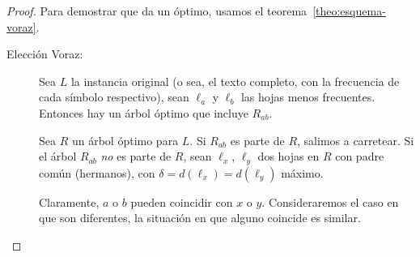   \begin{proof}
    Para demostrar que da un óptimo,
    usamos el teorema~\ref{theo:esquema-voraz}.
    \begin{description}
    \item[Elección Voraz:]
      Sea \(L\) la instancia original
      (o sea, el texto completo,
      con la frecuencia de cada símbolo respectivo),
      sean \(\ell_a\) y \(\ell_b\) las hojas menos frecuentes.
      Entonces hay un árbol óptimo que incluye \(R_{a b}\).

      Sea \(R\) un árbol óptimo para \(L\).
      Si \(R_{a b}\) es parte de \(R\),
      salimos a carretear.
      Si el árbol \(R_{a b}\) \emph{no} es parte de \(R\),
      sean \(\ell_x\), \(\ell_y\) dos hojas en \(R\) con padre común
      (hermanos),
      con \(\delta = d(\ell _x) = d(\ell_y)\) máximo.

      Claramente,
      \(a\) o \(b\) pueden coincidir con \(x\) o \(y\).
      Consideraremos el caso en que son diferentes,
      la situación en que alguno coincide es similar.


\end{description}
\end{proof}
